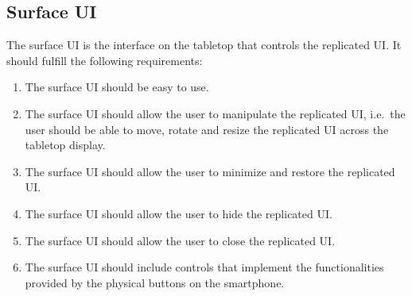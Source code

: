 
\subsection{Surface UI}

The surface UI is the interface on the tabletop that controls the replicated UI.
It should fulfill the following requirements:

\label{RD}
\begin{enumerate}[{RD}-1]
\item The surface UI should be easy to use.
\item The surface UI should allow the user to manipulate the replicated UI, i.e.\ the user should be able to move, rotate and resize the replicated UI across the tabletop display.
\item The surface UI should allow the user to minimize and restore the replicated UI.
\item The surface UI should allow the user to hide the replicated UI.
\item The surface UI should allow the user to close the replicated UI.
\item The surface UI should include controls that implement the functionalities provided by the physical buttons on the smartphone.
\end{enumerate}


%
%
%

